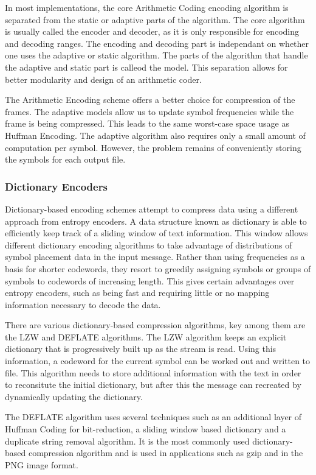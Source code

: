 \documentclass[a4paper,11pt]{report}
\begin{document}
In most implementations, the core Arithmetic Coding encoding algorithm is separated from the static or adaptive parts of the algorithm. The core algorithm is usually called the encoder and decoder, as it is only responsible for encoding and decoding ranges. The encoding and decoding part is independant on whether one uses the adaptive or static algorithm. The parts of the algorithm that handle the adaptive and static part is calleod the model. This separation allows for better modularity and design of an arithmetic coder.

The Arithmetic Encoding scheme offers a better choice for compression of the frames. The adaptive models allow us to update symbol frequencies while the frame is being compressed. This leads to the same worst-case space usage as Huffman Encoding. The adaptive algorithm also requires only a small amount of computation per symbol. However, the problem remains of conveniently storing the symbols for each output file.

\subsubsection{Dictionary Encoders}

Dictionary-based encoding schemes attempt to compress data using a different approach from entropy encoders\cite{RefWorks:2}. A data structure known as dictionary is able to efficiently keep track of a sliding window of text information. This window allows different dictionary encoding algorithms to take advantage of distributions of symbol placement data in the input message. Rather than using frequencies as a basis for shorter codewords, they resort to greedily assigning symbols or groups of symbols to codewords of increasing length. This gives certain advantages over entropy encoders, such as being fast and requiring little or no mapping information necessary to decode the data. 

There are various dictionary-based compression algorithms, key among them are the LZW and DEFLATE algorithms. The LZW algorithm keeps an explicit dictionary that is progressively built up as the stream is read.\cite{1320134} Using this information, a codeword for the current symbol can be worked out and written to file. This algorithm needs to store additional information with the text in order to reconsitute the initial dictionary, but after this the message can recreated by dynamically updating the dictionary. 

The DEFLATE algorithm uses several techniques such as an additional layer of Huffman Coding for bit-reduction, a sliding window based dictionary and a duplicate string removal algorithm\cite{deflaterfc}. It is the most commonly used dictionary-based compression algorithm and is used in applications such as gzip and in the PNG image format. 
\end{document}
